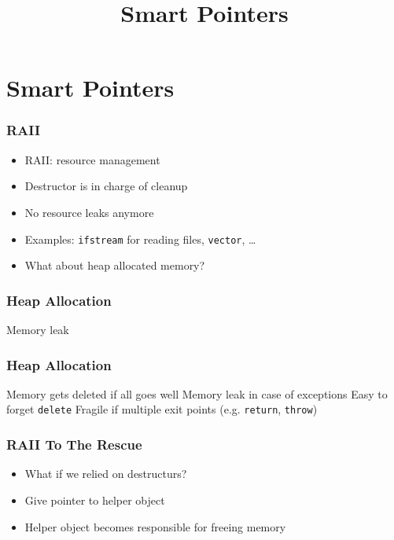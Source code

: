 

\usetikzlibrary{shadows,shapes.multipart}

\title{Smart Pointers}



\lstset{language=c++14}



\begin{frame}
  \titlepage
\end{frame}

\section{Smart Pointers}
\frame{\tableofcontents[currentsection]}

\begin{frame}
  \frametitle{RAII}
  \begin{itemize}
    \item RAII: resource management
    \item Destructor is in charge of cleanup
    \item No resource leaks anymore
    \item Examples: {\tt ifstream} for reading files, {\tt vector}, \dots
    \item What about heap allocated memory?
  \end{itemize}
\end{frame}

\begin{frame}
  \frametitle{Heap Allocation}
  \begin{procontralist}
    \con Memory leak
  \end{procontralist}
\end{frame}

\begin{frame}
  \frametitle{Heap Allocation}
  \begin{procontralist}
    \pro Memory gets deleted if all goes well
    \con Memory leak in case of exceptions
    \con Easy to forget {\tt delete}
    \con Fragile if multiple exit points (e.g. {\tt return}, {\tt throw})
  \end{procontralist}
\end{frame}

\begin{frame}
  \frametitle{RAII To The Rescue}
  \begin{itemize}
    \item What if we relied on destructurs?
    \item Give pointer to helper object
    \item Helper object becomes responsible for freeing memory
  \end{itemize}
\end{frame}

